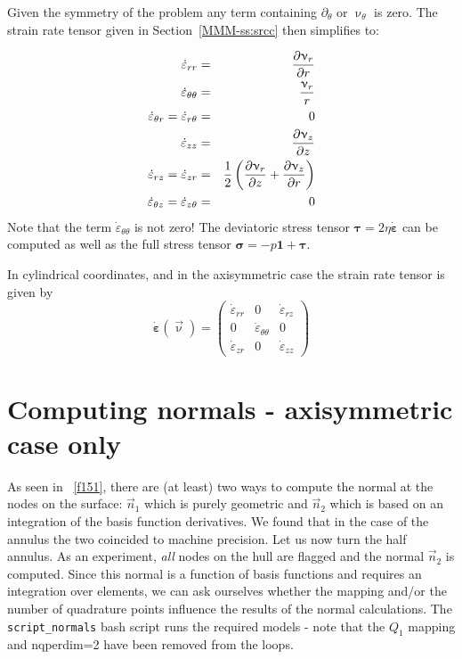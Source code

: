 Given the symmetry of the problem any term containing $\partial_\theta$ or $\upnu_\theta$ is zero.
The strain rate tensor given in Section~\ref{MMM-ss:srcc} then simplifies to:

\begin{eqnarray}
\dot\varepsilon_{rr} 
&=& \frac{\partial \upnu_r}{\partial r} \nonumber\\
\dot\varepsilon_{\theta\theta}  &=& \frac{\upnu_r}{r} \nonumber\\
\dot\varepsilon_{\theta r} = \dot\varepsilon_{r\theta}  &=& 0 \nonumber\\
\dot\varepsilon_{zz} &=& \frac{\partial \upnu_z}{\partial z} \nonumber\\
\dot{\varepsilon}_{rz} = \dot{\varepsilon}_{zr} 
&=& \frac{1}{2}\left( \frac{\partial \upnu_r}{\partial z} + \frac{\partial \upnu_z}{\partial r} \right) \nonumber\\
\dot{\varepsilon}_{\theta z} = \dot{\varepsilon}_{z \theta} &=& 0 \nonumber
\end{eqnarray}
Note that the term $\dot\varepsilon_{\theta\theta} $ is not zero!
The deviatoric stress tensor ${\bm \tau}=2\eta \dot{\bm \varepsilon}$ can be computed
as well as the full stress tensor ${\bm \sigma}=-p {\bm 1} + {\bm \tau}$. 


In cylindrical coordinates, and in the axisymmetric case
the strain rate tensor is given by
\[
\dot{\bm\varepsilon}(\vec\upnu)
=
\left(
\begin{array}{ccc}
\dot\varepsilon_{rr} & 0 & \dot{\varepsilon}_{rz} \\
0 & \dot{\varepsilon}_{\theta\theta}  & 0 \\
\dot{\varepsilon}_{zr} & 0 & \dot\varepsilon_{zz}
\end{array}
\right)
\]





\newpage
\section*{Computing normals - axisymmetric case only}

As seen in \stone~\ref{f151}, there are (at least) two ways to compute the normal at the
nodes on the surface: $\vec{n}_1$ which is purely geometric and $\vec{n}_2$ which is based 
on an integration of the basis function derivatives.
We found that in the case of the annulus the two coincided to machine precision. 
Let us now turn the half annulus. As an experiment, {\it all} nodes on the hull are flagged
and the normal $\vec{n}_2$ is computed. 
Since this normal is a function of basis functions and requires an integration 
over elements, we can ask ourselves whether the mapping and/or the number
of quadrature points influence the results of the normal calculations.
The {\tt script\_normals} bash script runs the required models - note that the
$Q_1$ mapping and nqperdim=2 have been removed from the loops.

